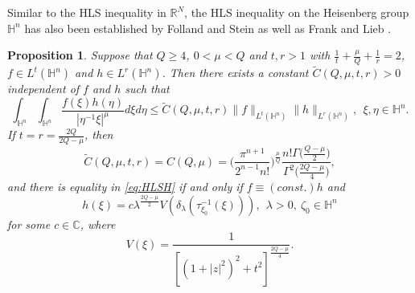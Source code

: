 \documentclass[11pt]{article}
\newtheorem{proposition}{Proposition}[section]
\begin{document}
Similar to the HLS inequality in $\mathbb{R}^{N}$, the HLS inequality on the Heisenberg group
$\mathbb{H}^{n}$
has also been established by Folland and Stein \cite{FS74} as well as Frank and Lieb \cite{FL12}.
\begin{proposition}%
	Suppose that  $Q\geq 4$, $0<\mu< Q$ and $t,r>1$ with $\frac{1}{t}+\frac{\mu}{Q}+\frac{1}{r}=2$, $f\in L^{t}(\mathbb{H}^{n})$ and $h\in L^{r}(\mathbb{H}^{n})$. Then there exists a constant $\widetilde{C}(Q,\mu,t,r)>0$ independent of $f$ and $h$ such that
	\begin{equation}\label{eq:HLSH} \int_{\mathbb{H}^{n}}\int_{\mathbb{H}^{n}}\frac{f(\xi)h(\eta)}{|\eta^{-1}\xi|^{\mu}}
d\xi{d}\eta\leq \widetilde{C}(Q,\mu,t,r)\|f\|_{L^t(\mathbb{H}^{n})}\|h\|_{L^r(\mathbb{H}^{n})}, ~~\xi,\eta\in\mathbb{H}^{n}.
	\end{equation}	
	If $t=r=\frac{2Q}{2Q-\mu}$, then
\begin{equation}\label{equH}
  \widetilde{C}(Q,\mu,t,r)=C(Q,\mu)=\bigg(\frac{\pi^{n+1}}{2^{n-1}n!}\bigg)^{\frac{\mu}{Q}}
  \frac{n!\Gamma\big(\frac{Q-\mu}{2}\big)}{\Gamma^2\big(\frac{2Q-\mu}{4}\big)},
\end{equation}
and there is equality in \eqref{eq:HLSH} if and only if $f\equiv (const.)h$ and
\begin{equation*}
  h(\xi)=c\lambda^{\frac{2Q-\mu}{2}}V(\delta_\lambda(\tau_{\xi_0}^{-1}(\xi))),
  ~~\lambda>0,~\zeta_{0}\in\mathbb{H}^{n}%
\end{equation*}
for some $c\in \mathbb{C}$, %
where
\begin{equation*}%
		V(\xi)=\frac{1}{[(1+|z|^{2})^{2}+t^{2}]^{\frac{2Q-\mu}{4}}}.
	\end{equation*}
\end{proposition}
\end{document}
